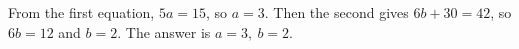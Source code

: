 From the first equation, $5a=15$, so $a=3$. Then the second gives $6b+30=42$, so $6b=12$ and $b=2$. The answer is $\boxed{a=3,\ b=2}$.
